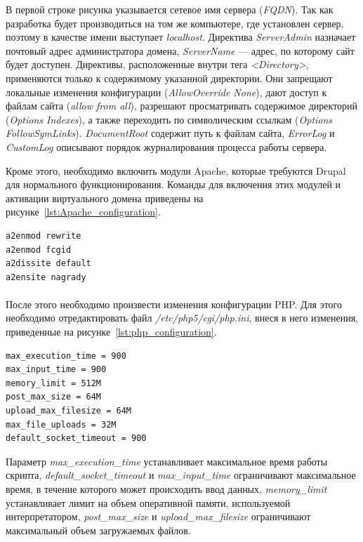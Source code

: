 В первой строке рисунка указывается сетевое имя сервера (\textit{FQDN}). 
Так как разработка будет производиться на том же компьютере, 
где установлен сервер, поэтому в качестве имени выступает \textit{localhost}.
Директива \textit{ServerAdmin} назначает почтовый адрес администратора домена, 
\textit{ServerName} --- адрес, по которому сайт будет доступен.
Директивы, расположенные внутри тега \textit{<Directory>}, применяются только
к содержимому указанной директории.
Они запрещают локальные изменения конфигурации (\textit{AllowOverride None}),
дают доступ к файлам сайта (\textit{allow from all}),
разрешают просматривать содержимое директорий (\textit{Options Indexes}),
а также переходить по символическим ссылкам (\textit{Options FollowSymLinks}).
\textit{DocumentRoot} содержит путь к файлам сайта,
\textit{ErrorLog} и \textit{CustomLog} описывают порядок журналирования
процесса работы сервера.

Кроме этого, необходимо включить модули Apache, которые требуются Drupal для 
нормального функционирования. Команды для включения этих модулей и активации 
виртуального домена приведены на рисунке~\ref{lst:Apache_configuration}.

\begin{lstlisting}[language=bash,
  caption=Команды включения дополнительных модулей
  Apache и активации виртуального домена,
  label=lst:Apache_configuration]
a2enmod rewrite
a2enmod fcgid
a2dissite default
a2ensite nagrady
\end{lstlisting}

\paragraph{}
После этого необходимо произвести изменения конфигурации PHP.
Для этого необходимо отредактировать файл \textit{/etc/php5/cgi/php.ini},
внеся в него изменения, приведенные на рисунке~\ref{lst:php_configuration}.

\begin{lstlisting}[language=bash,
  caption=Измененные параметры файла php.ini,
  label=lst:php_configuration]
max_execution_time = 900
max_input_time = 900
memory_limit = 512M
post_max_size = 64M
upload_max_filesize = 64M
max_file_uploads = 32M
default_socket_timeout = 900
\end{lstlisting}

Параметр \textit{max\_execution\_time} устанавливает максимальное 
время работы скрипта,
\textit{default\_socket\_timeout} и \textit{max\_input\_time} ограничивают
максимальное время, в течение которого может происходить ввод данных,  
\textit{memory\_limit} устанавливает лимит на объем оперативной памяти,
используемой интерпретатором,
\textit{post\_max\_size} и \textit{upload\_max\_filesize} ограничивают
максимальный объем загружаемых файлов.

